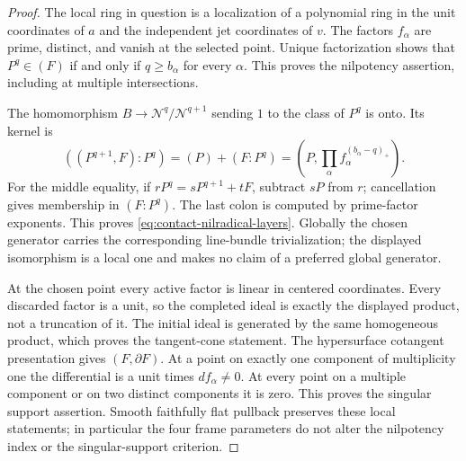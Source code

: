 \begin{proof}
The local ring in question is a localization of a polynomial ring
in the unit coordinates of $a$ and the independent jet coordinates
of $v$. The factors $f_\alpha$ are prime, distinct, and vanish at
the selected point. Unique factorization shows that $P^q\in(F)$
if and only if $q\ge b_\alpha$ for every $\alpha$. This proves the
nilpotency assertion, including at multiple intersections.

The homomorphism $B\to\mathcal N^q/\mathcal N^{q+1}$ sending
$1$ to the class of $P^q$ is onto. Its kernel is
\[
 ((P^{q+1},F):P^q)
       =(P)+(F:P^q)
       =\left(P,\prod_\alpha f_\alpha^{(b_\alpha-q)_+}\right).
\]
For the middle equality, if $rP^q=sP^{q+1}+tF$, subtract $sP$
from $r$; cancellation gives membership in $(F:P^q)$. The last
colon is computed by prime-factor exponents. This proves
\eqref{eq:contact-nilradical-layers}. Globally the chosen generator
carries the corresponding line-bundle trivialization; the displayed
isomorphism is a local one and makes no claim of a preferred global
generator.

At the chosen point every active factor is linear in centered
coordinates. Every discarded factor is a unit, so the completed
ideal is exactly the displayed product, not a truncation of it.
The initial ideal is generated by the same homogeneous product,
which proves the tangent-cone statement. The hypersurface
cotangent presentation gives $(F,\partial F)$. At a point on
exactly one component of multiplicity one the differential is a
unit times $df_\alpha\ne0$. At every point on a multiple component
or on two distinct components it is zero. This proves the singular
support assertion. Smooth faithfully flat pullback preserves these
local statements; in particular the four frame parameters do not
alter the nilpotency index or the singular-support criterion.
\end{proof}

